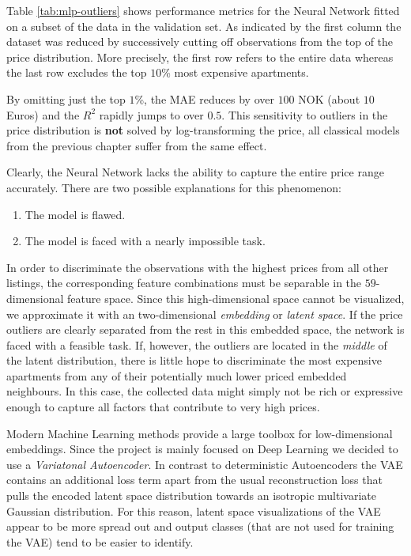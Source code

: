 \documentclass[12pt, letterpaper]{article}
\begin{document}
Table \ref{tab:mlp-outliers} shows performance metrics for the Neural Network fitted on a subset of the data in the validation set.
As indicated by the first column the dataset was reduced by successively cutting off observations from the top of the price distribution.
More precisely, the first row refers to the entire data whereas the last row excludes the top $10$\% most expensive apartments.

By omitting just the top $1$\%, the MAE reduces by over $100$ NOK (about $10$ Euros) and the $R^2$ rapidly jumps to over $0.5$.
This sensitivity to outliers in the price distribution is \textbf{not} solved by log-transforming the price, all classical models from the previous chapter suffer from the same effect.

Clearly, the Neural Network lacks the ability to capture the entire price range accurately.
There are two possible explanations for this phenomenon:
\begin{enumerate}
    \item The model is flawed.
    \item The model is faced with a nearly impossible task.
\end{enumerate}
In order to discriminate the observations with the highest prices from all other listings, the corresponding feature combinations must be separable in the $59$-dimensional feature space.
Since this high-dimensional space cannot be visualized, we approximate it with an two-dimensional \emph{embedding} or \emph{latent space}.
If the price outliers are clearly separated from the rest in this embedded space, the network is faced with a feasible task.
If, however, the outliers are located in the \emph{middle} of the latent distribution, there is little hope to discriminate the most expensive apartments from any of their potentially much lower priced embedded neighbours.
In this case, the collected data might simply not be rich or expressive enough to capture all factors that contribute to very high prices.

Modern Machine Learning methods provide a large toolbox for low-dimensional embeddings.
Since the project is mainly focused on Deep Learning we decided to use a \emph{Variatonal Autoencoder}.
In contrast to deterministic Autoencoders the VAE contains an additional loss term apart from the usual reconstruction loss that pulls the encoded latent space distribution towards an isotropic multivariate Gaussian distribution.
For this reason, latent space visualizations of the VAE appear to be more spread out and output classes (that are not used for training the VAE) tend to be easier to identify.
\end{document}
